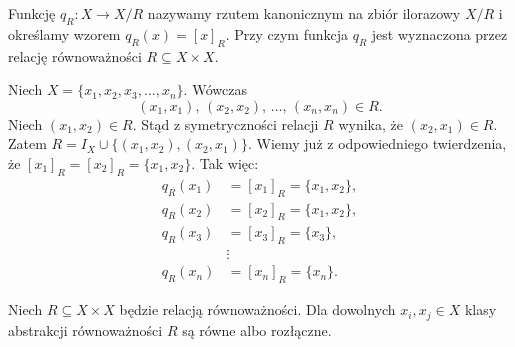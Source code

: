 \begin{definition}
Funkcję $q_{R}:X\rightarrow X/R$ nazywamy rzutem kanonicznym na zbiór ilorazowy $X/R$ i określamy wzorem $q_{R}(x)=[x]_{R}$. Przy czym funkcja $q_{R}$ jest wyznaczona przez relację równoważności $R\subseteq X\times X$.
\end{definition}
\begin{exercise}
Niech $X=\{x_{1},x_{2},x_{3},\ldots,x_{n}\}$. Wówczas
\[
(x_{1},x_{1}),\,(x_{2},x_{2}),\,\ldots,\,(x_{n},x_{n})\in R.
\]
Niech $(x_{1},x_{2})\in R$. Stąd z symetryczności relacji $R$ wynika,
że $(x_{2},x_{1})\in R$. Zatem $R= I_{X}\cup\{(x_{1},x_{2}),(x_{2},x_{1})\}$.
Wiemy już z odpowiedniego twierdzenia, że $[x_{1}]_{R}=[x_{2}]_{R}=\{x_{1},x_{2}\}$.
Tak więc:
\begin{align*}
q_{R}(x_{1}) &= [x_{1}]_{R} = \{x_{1},x_{2}\}, \\
q_{R}(x_{2}) &= [x_{2}]_{R} = \{x_{1},x_{2}\}, \\
q_{R}(x_{3}) &= [x_{3}]_{R} = \{x_{3}\}, \\
&\vdots \\
q_{R}(x_{n}) &= [x_{n}]_{R} = \{x_{n}\}.
\end{align*}
\end{exercise}
\begin{theorem}
Niech $R\subseteq X\times X$ będzie relacją równoważności. Dla dowolnych $x_{i},x_{j}\in X$ klasy abstrakcji równoważności $R$ są równe albo rozłączne.
\end{theorem}
